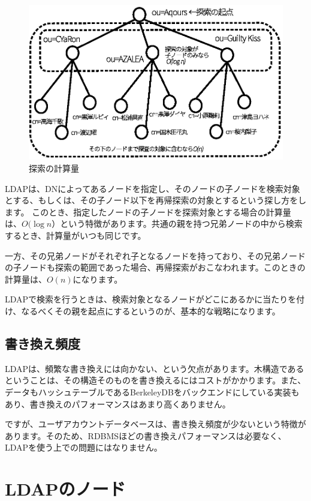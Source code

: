 \begin{figure}[htbp]
	\includegraphics[width=12cm,clip]{draw/order.eps}
	\caption{探索の計算量}
	\label{fig:order}
\end{figure}

LDAPは、DNによってあるノードを指定し、そのノードの子ノードを検索対象とする、もしくは、その子ノード以下を再帰探索の対象とするという探し方をします。
このとき、指定したノードの子ノードを探索対象とする場合の計算量は、$O(\log n）$という特徴があります。共通の親を持つ兄弟ノードの中から検索するとき、計算量がいつも同じです。

一方、その兄弟ノードがそれぞれ子となるノードを持っており、その兄弟ノードの子ノードも探索の範囲であった場合、再帰探索がおこなわれます。このときの計算量は、$O(n)$になります。

LDAPで検索を行うときは、検索対象となるノードがどこにあるかに当たりを付け、なるべくその親を起点にするというのが、基本的な戦略になります。

\subsection{書き換え頻度}

LDAPは、頻繁な書き換えには向かない、という欠点があります。木構造であるということは、その構造そのものを書き換えるにはコストがかかります。また、データもハッシュテーブルであるBerkeleyDBをバックエンドにしている実装もあり、書き換えのパフォーマンスはあまり高くありません。

ですが、ユーザアカウントデータベースは、書き換え頻度が少ないという特徴があります。そのため、RDBMSほどの書き換えパフォーマンスは必要なく、LDAPを使う上での問題にはなりません。

\section{LDAPのノード}


